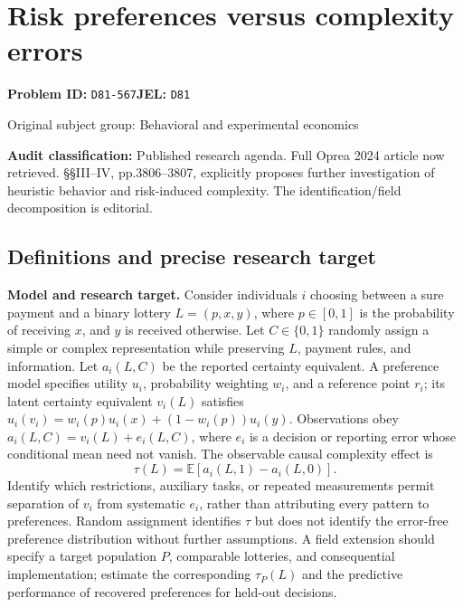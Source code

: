 \documentclass[11pt,a4paper]{article}
\begin{document}
\section*{Risk preferences versus complexity errors}
\textbf{Problem ID:} \texttt{D81-567}\quad \textbf{JEL:} \texttt{D81}\par
\label{problem:OP-0300}
{\sffamily\small\color{muted}Original subject group: Behavioral and experimental economics\par}
\label{definitions:problem:30007582}
\textbf{Audit classification:} Published research agenda. Full Oprea 2024 article now retrieved. §§III–IV, pp.3806–3807, explicitly proposes further investigation of heuristic behavior and risk-induced complexity. The identification/field decomposition is editorial.
\subsection*{Definitions and precise research target}
\textbf{Model and research target.} Consider individuals \(i\) choosing between a sure payment and a binary lottery \(L=(p,x,y)\), where \(p\in[0,1]\) is the probability of receiving \(x\), and \(y\) is received otherwise. Let \(C\in\{0,1\}\) randomly assign a simple or complex representation while preserving \(L\), payment rules, and information. Let \(a_i(L,C)\) be the reported certainty equivalent. A preference model specifies utility \(u_i\), probability weighting \(w_i\), and a reference point \(r_i\); its latent certainty equivalent \(v_i(L)\) satisfies \(u_i(v_i)=w_i(p)u_i(x)+(1-w_i(p))u_i(y)\). Observations obey \(a_i(L,C)=v_i(L)+e_i(L,C)\), where \(e_i\) is a decision or reporting error whose conditional mean need not vanish. The observable causal complexity effect is
\[\tau(L)=\mathbb E[a_i(L,1)-a_i(L,0)].\]
Identify which restrictions, auxiliary tasks, or repeated measurements permit separation of \(v_i\) from systematic \(e_i\), rather than attributing every pattern to preferences. Random assignment identifies \(\tau\) but does not identify the error-free preference distribution without further assumptions. A field extension should specify a target population \(P\), comparable lotteries, and consequential implementation; estimate the corresponding \(\tau_P(L)\) and the predictive performance of recovered preferences for held-out decisions.
\end{document}
